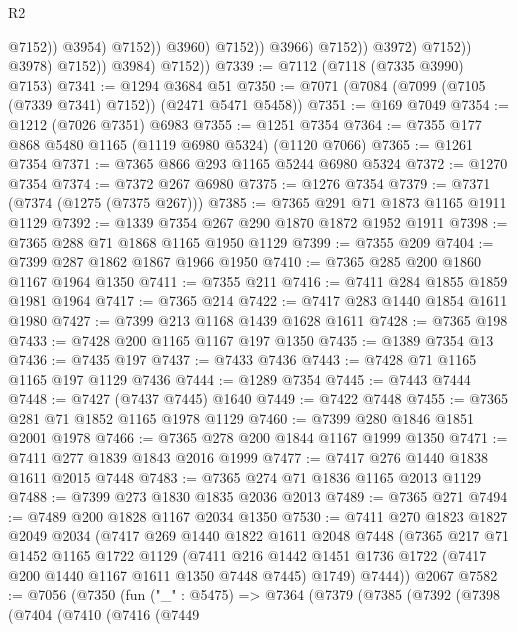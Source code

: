 \begin{lexlean}{R2}
\begin{coremodule}
                                            @7152))
                                        @3954)
                                      @7152))
                                  @3960)
                                @7152))
                            @3966)
                          @7152))
                      @3972)
                    @7152))
                @3978)
              @7152))
          @3984)
        @7152))
@7339 := @7112 (@7118 (@7335 @3990) @7153)
@7341 := @1294 @3684 @51
@7350 := @7071 (@7084 (@7099 (@7105 (@7339 @7341) @7152)) (@2471 @5471 @5458))
@7351 := @169 @7049
@7354 := @1212 (@7026 @7351) @6983
@7355 := @1251 @7354
@7364 := @7355 @177 @868 @5480 @1165 (@1119 @6980 @5324) (@1120 @7066)
@7365 := @1261 @7354
@7371 := @7365 @866 @293 @1165 @5244 @6980 @5324
@7372 := @1270 @7354
@7374 := @7372 @267 @6980
@7375 := @1276 @7354
@7379 := @7371 (@7374 (@1275 (@7375 @267)))
@7385 := @7365 @291 @71 @1873 @1165 @1911 @1129
@7392 := @1339 @7354 @267 @290 @1870 @1872 @1952 @1911
@7398 := @7365 @288 @71 @1868 @1165 @1950 @1129
@7399 := @7355 @209
@7404 := @7399 @287 @1862 @1867 @1966 @1950
@7410 := @7365 @285 @200 @1860 @1167 @1964 @1350
@7411 := @7355 @211
@7416 := @7411 @284 @1855 @1859 @1981 @1964
@7417 := @7365 @214
@7422 := @7417 @283 @1440 @1854 @1611 @1980
@7427 := @7399 @213 @1168 @1439 @1628 @1611
@7428 := @7365 @198
@7433 := @7428 @200 @1165 @1167 @197 @1350
@7435 := @1389 @7354 @13
@7436 := @7435 @197
@7437 := @7433 @7436
@7443 := @7428 @71 @1165 @1165 @197 @1129 @7436
@7444 := @1289 @7354
@7445 := @7443 @7444
@7448 := @7427 (@7437 @7445) @1640
@7449 := @7422 @7448
@7455 := @7365 @281 @71 @1852 @1165 @1978 @1129
@7460 := @7399 @280 @1846 @1851 @2001 @1978
@7466 := @7365 @278 @200 @1844 @1167 @1999 @1350
@7471 := @7411 @277 @1839 @1843 @2016 @1999
@7477 := @7417 @276 @1440 @1838 @1611 @2015 @7448
@7483 := @7365 @274 @71 @1836 @1165 @2013 @1129
@7488 := @7399 @273 @1830 @1835 @2036 @2013
@7489 := @7365 @271
@7494 := @7489 @200 @1828 @1167 @2034 @1350
@7530 := @7411
    @270
    @1823
    @1827
    @2049
    @2034
    (@7417
      @269
      @1440
      @1822
      @1611
      @2048
      @7448
      (@7365
        @217
        @71
        @1452
        @1165
        @1722
        @1129
        (@7411 @216 @1442 @1451 @1736 @1722 (@7417 @200 @1440 @1167 @1611 @1350 @7448 @7445) @1749)
        @7444))
    @2067
@7582 := @7056
    (@7350
      (fun ("_" : @5475) =>
      @7364
        (@7379
          (@7385
            (@7392
              (@7398
                (@7404
                  (@7410
                    (@7416
                      (@7449

\end{coremodule}
\end{lexlean}
